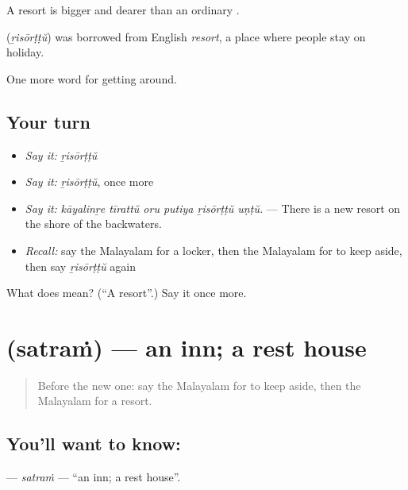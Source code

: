 A resort is bigger and dearer than an ordinary .

\begin{cousinweb}
\textbf{} (\emph{ṟisōrṭṭŭ}) was borrowed from English \emph{resort}, a place where people stay on holiday.
\end{cousinweb}

\begin{grammarlens}[title={What you've built}]
One more word for getting around.
\end{grammarlens}

\subsection*{Your turn}
\begin{itemize}
\raggedright
  \item \emph{Say it:} \emph{ṟisōrṭṭŭ}
  \item \emph{Say it:} \emph{ṟisōrṭṭŭ}, once more
  \item \emph{Say it:} \emph{kāyalinṟe tīrattŭ oru putiya ṟisōrṭṭŭ uṇṭŭ.} — There is a new resort on the shore of the backwaters.
  \item \emph{Recall:} say the Malayalam for a locker, then the Malayalam for to keep aside, then say \emph{ṟisōrṭṭŭ} again
\end{itemize}

\begin{tcolorbox}[breakable,colback=teal!4,colframe=teal!35!black,title={Before you move on}]
What does  mean? (\textquotedblleft{}A resort\textquotedblright{}.) Say it once more.
\end{tcolorbox}
\section[\texorpdfstring{\ml{സത്രം} (satraṁ)}{സത്രം (satraṁ)}]{ (satraṁ) — an inn; a rest house}

\label{lesson:ML-C481-satram}



\begin{quote}
Before the new one: say the Malayalam for to keep aside, then the Malayalam for a resort.
\end{quote}

\subsection*{You'll want to know: }
\textbf{} — \emph{satraṁ} — \textquotedblleft{}an inn; a rest house\textquotedblright{}.

